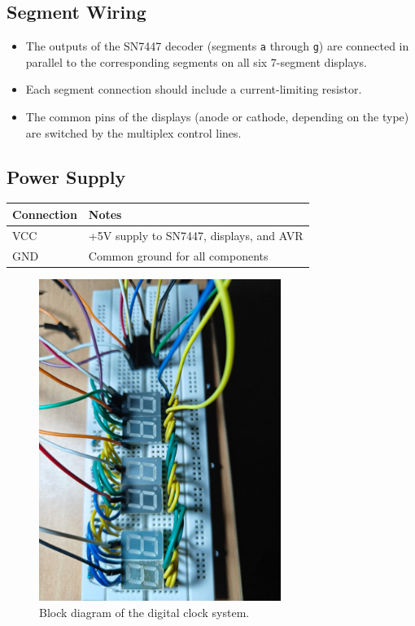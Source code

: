 \documentclass{article}
\theoremstyle{remark}
\begin{document}
\subsection{Segment Wiring}
\begin{itemize}[noitemsep]
    \item The outputs of the SN7447 decoder (segments \texttt{a} through \texttt{g}) are connected in parallel to the corresponding segments on all six 7-segment displays.
    \item Each segment connection should include a current-limiting resistor.
    \item The common pins of the displays (anode or cathode, depending on the type) are switched by the multiplex control lines.
\end{itemize}

\subsection{Power Supply}
\begin{center}
\begin{tabular}{|l|l|}
\hline
\textbf{Connection} & \textbf{Notes} \\ \hline
VCC & +5V supply to SN7447, displays, and AVR \\ \hline
GND & Common ground for all components \\ \hline
\end{tabular}
\end{center}

\newpage 

\begin{figure}[h!]
  \centering
  \includegraphics[width=0.7\textwidth]{figs/circuit.png}
  \caption{Block diagram of the digital clock system.}
  \label{fig:clock_diagram}
\end{figure}
\end{document}
